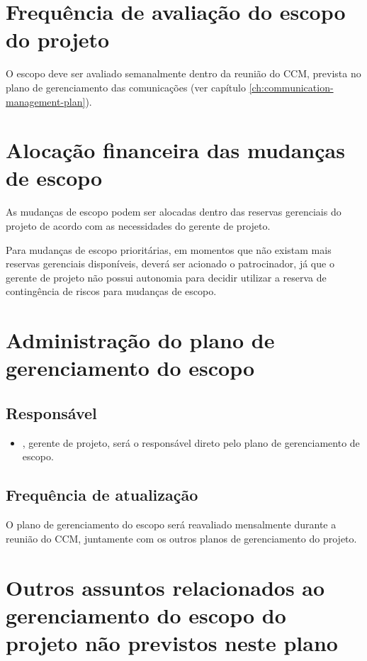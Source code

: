 \section{Frequência de avaliação do escopo do projeto}

O escopo deve ser avaliado semanalmente dentro da reunião do CCM, prevista no plano de gerenciamento das comunicações (ver capítulo \ref{ch:communication-management-plan}).

\section{Alocação financeira das mudanças de escopo}

As mudanças de escopo podem ser alocadas dentro das reservas gerenciais do projeto de acordo com as necessidades do gerente de projeto.

Para mudanças de escopo prioritárias, em momentos que não existam mais reservas gerenciais disponíveis, deverá ser acionado o patrocinador, já que o gerente de projeto não possui autonomia para decidir utilizar a reserva de contingência de riscos para mudanças de escopo.

\section{Administração do plano de gerenciamento do escopo}

\subsection{Responsável}

\begin{itemize}
	\item \projectManagerName, gerente de projeto, será o responsável direto pelo plano de gerenciamento de escopo.
\end{itemize}

\subsection{Frequência de atualização}

O plano de gerenciamento do escopo será reavaliado mensalmente durante a reunião do CCM, juntamente com os outros planos de gerenciamento do projeto.

\section{Outros assuntos relacionados ao gerenciamento do escopo do projeto não previstos neste plano}

